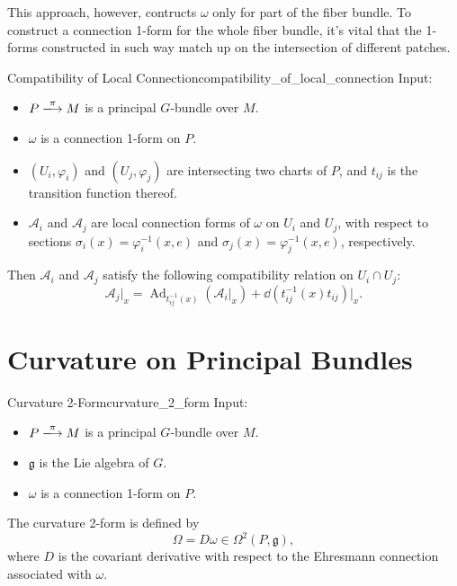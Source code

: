 \documentclass{article}
\begin{document}
This approach, however, contructs $\omega$ only for part of the fiber bundle.
To construct a connection 1-form for the whole fiber bundle, it's vital that the 1-forms constructed in such way match up on the intersection of different patches.

\begin{theorem}{Compatibility of Local Connection}{compatibility_of_local_connection}
    Input:
    \begin{itemize}
        \item $P\xlongrightarrow{\pi} M$ is a principal $G$-bundle over $M$.
        \item $\omega$ is a connection 1-form on $P$.
        \item $(U_i,\varphi_i)$ and $(U_j,\varphi_j)$ are intersecting two charts of $P$, and $t_{ij}$ is the transition function thereof.
        \item $\mathcal{A}_i$ and $\mathcal{A}_j$ are local connection forms of $\omega$ on $U_i$ and $U_j$, with respect to sections $\sigma_i(x) = \varphi^{-1}_i(x, e)$ and $\sigma_j(x) = \varphi^{-1}_j(x, e)$, respectively.
    \end{itemize}
    Then $\mathcal{A}_i$ and $\mathcal{A}_j$ satisfy the following compatibility relation on $U_i \cap U_j$:
    \[ \mathcal{A}_j\vert_x = \operatorname{Ad}_{t^{-1}_{ij}(x)}(\mathcal{A}_i\vert_x) + \dd{(t_{ij}^{-1}(x)t_{ij})}\vert_x. \]
\end{theorem}

\section{Curvature on Principal Bundles}

\begin{definition}{Curvature 2-Form}{curvature_2_form}
    Input:
    \begin{itemize}
        \item $P\xlongrightarrow{\pi} M$ is a principal $G$-bundle over $M$.
        \item $\mathfrak{g}$ is the Lie algebra of $G$.
        \item $\omega$ is a connection 1-form on $P$.
    \end{itemize}
    The curvature 2-form is defined by
    \[ \Omega = D\omega \in \Omega^2(P, \mathfrak{g}), \]
    where $D$ is the covariant derivative with respect to the Ehresmann connection associated with $\omega$.
\end{definition}
\end{document}
